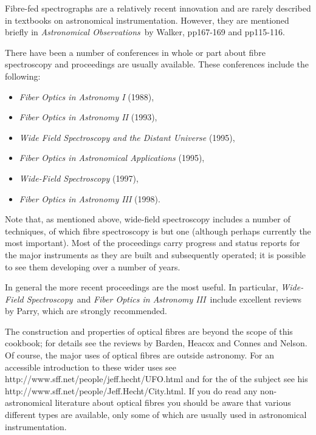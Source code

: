 \documentclass[chapters,twoside,11pt]{starlink}
\begin{document}
Fibre-fed spectrographs are a relatively recent innovation and are
rarely described in textbooks on astronomical instrumentation.  However,
they are mentioned briefly in \textit{Astronomical Observations}\, by
Walker\cite{WALKER87}, pp167-169 and pp115-116.

There have been a number of conferences in whole or part about fibre
spectroscopy and proceedings are usually available.  These conferences
include the following:

\begin{itemize}

  \item \textit{Fiber Optics in Astronomy I}\/\cite{BARDEN88} (1988),

  \item \textit{Fiber Optics in Astronomy II}\/\cite{GRAY93} (1993),

  \item \textit{Wide Field Spectroscopy and the Distant
   Universe}\/\cite{MADDOX95} (1995),

  \item \textit{Fiber Optics in Astronomical Applications}\/\cite{BARDEN95}
   (1995),

  \item \textit{Wide-Field Spectroscopy}\/\cite{KONTIZAS97} (1997),

  \item \textit{Fiber Optics in Astronomy III}\/\cite{ARRIBAS98} (1998).

\end{itemize}

Note that, as mentioned above,  wide-field spectroscopy includes a number
of techniques, of which fibre spectroscopy is but one (although perhaps
currently the most important).  Most of the proceedings carry progress
and status reports for the major instruments as they are built and
subsequently operated; it is possible to see them developing over a number
of years.

In general the more recent proceedings are the most useful.  In
particular, \textit{Wide-Field Spectroscopy}\, and \textit{Fiber Optics in
Astronomy III}\, include excellent reviews by Parry\cite{PARRY97,
PARRY98}, which are strongly recommended.

The construction and properties of optical fibres are beyond the scope
of this cookbook; for details see the reviews by Barden\cite{BARDEN98},
Heacox and Connes\cite{HEACOX92} and Nelson\cite{NELSON88}.  Of course,
the major uses of optical fibres are outside astronomy.  For an
accessible introduction to these wider uses see
{http://www.sff.net/people/jeff.hecht/UFO.html}\/\cite{HECHT98}
and for the
of the subject see his
{http://www.sff.net/people/Jeff.Hecht/City.html}\/\cite{HECHT99}.
If you do read any non-astronomical literature about optical fibres
you should be aware that various different types are available, only
some of which are usually used in astronomical instrumentation.
\end{document}
